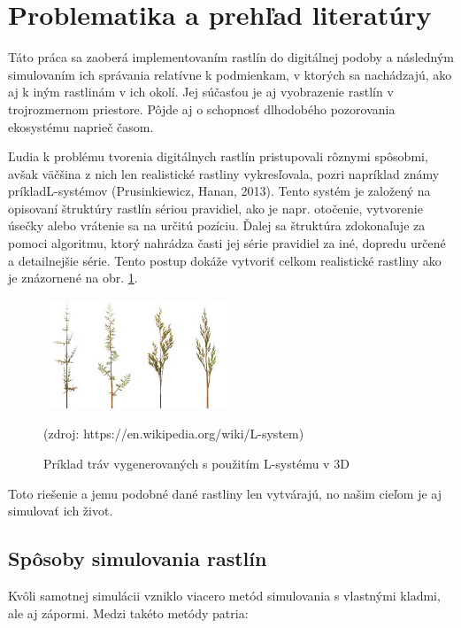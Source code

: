 \documentclass[12pt]{article}
\begin{document}
\section{Problematika a prehľad literatúry}

Táto práca sa zaoberá implementovaním rastlín do digitálnej podoby a následným
simulovaním ich správania relatívne k podmienkam, v ktorých sa nachádzajú,
ako aj k iným rastlinám v ich okolí. Jej súčasťou je aj vyobrazenie
rastlín v trojrozmernom priestore. Pôjde aj o schopnosť dlhodobého
pozorovania ekosystému naprieč časom.

Ľudia k problému tvorenia digitálnych rastlín pristupovali rôznymi spôsobmi,
avšak väčšina z nich len realistické rastliny vykresľovala, pozri napríklad
známy príklad\break L-systémov (Prusinkiewicz, Hanan, 2013). %
Tento systém je založený na opisovaní štruktúry rastlín
sériou pravidiel, ako je napr. otočenie, vytvorenie úsečky alebo
vrátenie sa na určitú pozíciu. Ďalej sa štruktúra zdokonaľuje za pomoci
algoritmu, ktorý nahrádza časti jej série pravidiel za iné, dopredu určené
a detailnejšie série. Tento postup dokáže vytvoriť celkom realistické rastliny
ako je znázornené na obr. \ref{obr:priklad l-systemu}.

\begin{figure}[ht]
	\centering
	\includegraphics[width=0.5\textwidth]{res/Fractal_weeds.png}
	\caption{Príklad tráv vygenerovaných s použitím L-systému v 3D}

	\footnotesize (zdroj: https://en.wikipedia.org/wiki/L-system)

	\label{obr:priklad l-systemu}
\end{figure}

Toto riešenie a jemu podobné dané rastliny len vytvárajú, no našim cieľom
je aj simulovať ich život.


\subsection{Spôsoby simulovania rastlín}

Kvôli samotnej simulácii vzniklo viacero metód simulovania s vlastnými kladmi,
ale aj zápormi. Medzi takéto metódy patria:
\end{document}
